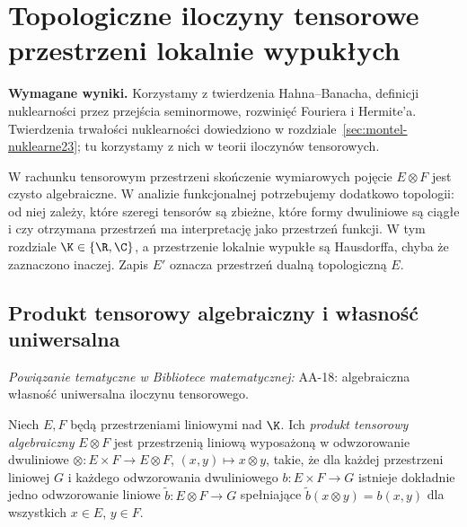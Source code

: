 \setcounter{section}{23}
\section{Topologiczne iloczyny tensorowe przestrzeni lokalnie wypukłych}
\label{sec:tensor24}

\providecommand{\atlasref}[2]{#2}


\noindent\textbf{Wymagane wyniki.} Korzystamy z twierdzenia
Hahna--Banacha, definicji nuklearności przez przejścia seminormowe,
rozwinięć Fouriera i Hermite'a. Twierdzenia trwałości nuklearności
dowiedziono w rozdziale~\ref{sec:montel-nuklearne23}; tu korzystamy z nich
w teorii iloczynów tensorowych.
\medskip

W rachunku tensorowym przestrzeni skończenie wymiarowych pojęcie
$E\otimes F$ jest czysto algebraiczne. W analizie funkcjonalnej
potrzebujemy dodatkowo topologii: od niej zależy, które szeregi
tensorów są zbieżne, które formy dwuliniowe są ciągłe i czy
otrzymana przestrzeń ma interpretację jako przestrzeń funkcji.
W tym rozdziale $\K\in\{\R,\C\}$, a przestrzenie lokalnie wypukłe
są Hausdorffa, chyba że zaznaczono inaczej. Zapis $E'$ oznacza
przestrzeń dualną topologiczną $E$.

\subsection{Produkt tensorowy algebraiczny i własność uniwersalna}

\noindent\emph{Powiązanie tematyczne w Bibliotece matematycznej:} \atlasref{AA-18::aa:tw:tensor-universal}{AA-18: algebraiczna własność uniwersalna iloczynu tensorowego}.


\begin{definicja}
\label{def:alg-tensor24}
Niech $E,F$ będą przestrzeniami liniowymi nad $\K$.
Ich \emph{produkt tensorowy algebraiczny} $E\otimes F$ jest
przestrzenią liniową wyposażoną w odwzorowanie dwuliniowe
$\otimes:E\times F\to E\otimes F$, $ (x,y)\mapsto x\otimes y$,
takie, że dla każdej przestrzeni liniowej $G$ i każdego
odwzorowania dwuliniowego $b:E\times F\to G$ istnieje dokładnie
jedno odwzorowanie liniowe $\widetilde b:E\otimes F\to G$
spełniające $\widetilde b(x\otimes y)=b(x,y)$ dla wszystkich
$x\in E$, $y\in F$.
\end{definicja}

